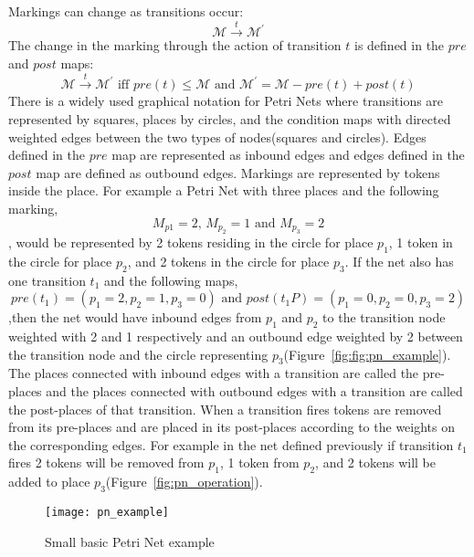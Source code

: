 Markings can change as transitions occur:
\begin{equation*}
\mathcal{M}\overset{t}{\longrightarrow}\mathcal{M^\prime}
\end{equation*}
The change in the marking through the action of transition $t$ is
defined in the $pre$ and $post$ maps:
\begin{equation*}
\mathcal{M}\overset{t}{\longrightarrow}\mathcal{M^\prime} \mbox{ iff } pre(t) \leq \mathcal{M} \mbox{ and } \mathcal{M^\prime} = \mathcal{M} - pre(t) + post(t)
\end{equation*}
There is a widely used graphical notation for Petri Nets where
transitions are represented by squares, places by circles, and the
condition maps with directed weighted edges between the two types of
nodes(squares and circles). Edges defined in the $pre$ map are
represented as inbound edges and edges defined in the $post$ map are
defined as outbound edges. Markings are represented by tokens inside
the place. For example a Petri Net with three places and the following
marking,
\begin{equation*}
M_{p1} = 2\mbox{, } M_{p_2}=1 \mbox{ and } M_{p_3} = 2
\end{equation*}
, would be represented by 2 tokens residing in the circle for place
$p_1$, 1 token in the circle for place $p_2$, and 2 tokens in the
circle for place $p_3$. If the net also has one transition $t_1$ and
the following maps,
\begin{equation*}
pre(t_1) = (p_1 = 2, p_2 = 1, p_3=0) \mbox{ and } post(t_1P) = (p_1
=0, p_2=0, p_3=2)
\end{equation*}
,then the net would have inbound edges from $p_1$ and $p_2$ to the
transition node weighted with 2 and 1 respectively and an outbound edge
weighted by 2 between the transition node and the circle representing
$p_3$(Figure~\ref{fig:fig:pn_example}). The places connected with
inbound edges with a transition are called the pre-places and the
places connected with outbound edges with a transition are called the
post-places of that transition. When a transition fires tokens are removed from its
pre-places and are placed in its post-places according to the weights
on the corresponding edges. For example in the net defined previously
if transition $t_1$ fires 2 tokens will be removed from $p_1$, 1 token
from $p_2$, and 2 tokens will be added to place $p_3$(Figure~\ref{fig:pn_operation}).

\begin{figure}
\centering
\texttt{[image: pn\_example]}
\caption{Small basic Petri Net example}
\label{fig:pn_example}
\end{figure}

